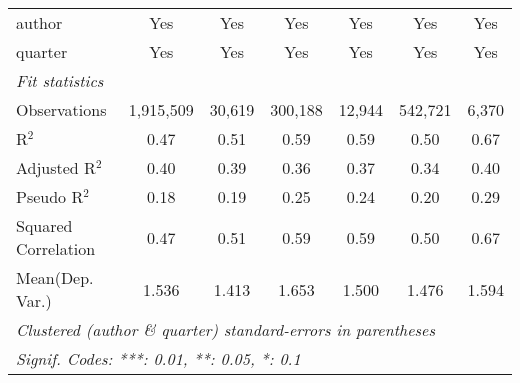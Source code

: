 \begin{tabular}{lcccccc}
   author                                                     & Yes            & Yes           & Yes           & Yes          & Yes            & Yes\\  
   quarter                                                    & Yes            & Yes           & Yes           & Yes          & Yes            & Yes\\  
   \midrule
   \emph{Fit statistics}\\
   Observations                                               & 1,915,509      & 30,619        & 300,188       & 12,944       & 542,721        & 6,370\\  
   R$^2$                                                      & 0.47           & 0.51          & 0.59          & 0.59         & 0.50           & 0.67\\  
   Adjusted R$^2$                                             & 0.40           & 0.39          & 0.36          & 0.37         & 0.34           & 0.40\\  
   Pseudo R$^2$                                               & 0.18           & 0.19          & 0.25          & 0.24         & 0.20           & 0.29\\  
   Squared Correlation                                        & 0.47           & 0.51          & 0.59          & 0.59         & 0.50           & 0.67\\  
Mean(Dep. Var.) & 1.536 & 1.413 & 1.653 & 1.500 & 1.476 & 1.594 \\
   \midrule \midrule
   \multicolumn{7}{l}{\emph{Clustered (author \& quarter) standard-errors in parentheses}}\\
   \multicolumn{7}{l}{\emph{Signif. Codes: ***: 0.01, **: 0.05, *: 0.1}}\\
\end{tabular}
\par\endgroup
